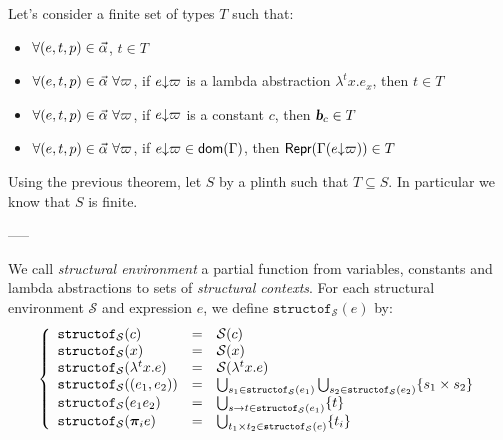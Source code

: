 \documentclass[a4paper]{article}
\theoremstyle{definition}
\begin{document}
    Let's consider a finite set of types $T$ such that:
    \begin{itemize}
      \item $\forall (e,t,p) \in \vec \alpha$, $t \in T$
      \item $\forall (e,t,p) \in \vec \alpha\ \forall \varpi$, if $e{\downarrow}\varpi$ is a lambda abstraction $\lambda^tx.e_x$, then $t \in T$
      \item $\forall (e,t,p) \in \vec \alpha\ \forall \varpi$, if $e{\downarrow}\varpi$ is a constant $c$, then $\basic{c} \in T$
      \item $\forall (e,t,p) \in \vec \alpha\ \forall \varpi$, if $e{\downarrow}\varpi \in \textsf{dom}(\Gamma)$, then $\textsf{Repr}(\Gamma(e{\downarrow}\varpi)) \in T$
    \end{itemize}

    Using the previous theorem, let $S$ by a plinth such that $T \subseteq S$. In particular we know that $S$ is finite.

    \newcommand{\struct}[0]{\mathcal{S}}
    \newcommand{\pathstr}[2]{\texttt{path\_struct}_{#1}(#2)}
    \newcommand{\structof}[2]{\texttt{structof}_{#1}(#2)}
    \newcommand{\refinestr}[2]{\texttt{RefineStr}_{#1}(#2)}
    \newcommand{\auxstr}[1]{\texttt{AuxStr}_{#1}}
    \newcommand{\structs}[2]{\texttt{Struct}_{#1}(#2)}

    -----

    We call \textit{structural environment} a partial function from variables, constants and lambda abstractions to sets of \textit{structural contexts}.
    For each structural environment $\struct$ and expression $e$, we define $\structof \struct e$ by:
    \[
      \left\{
        \begin{array}{lcl}
          \structof{\struct}{c} & = & \struct(c) \\
          \structof{\struct}{x} & = & \struct(x) \\
          \structof{\struct}{\lambda^tx.e} & = & \struct(\lambda^tx.e) \\
          \structof{\struct}{(e_1,e_2)} & = & \bigcup_{s_1\in\structof{\struct}{e_1}}\bigcup_{s_2\in\structof{\struct}{e_2}}  \{ \pair {s_1} {s_2} \} \\
          \structof{\struct}{e_1 e_2} & = & \bigcup_{\arrow s t\in\structof{\struct}{e_1}} \{ t \} \\
          \structof{\struct}{\bpi_i e} & = & \bigcup_{\pair {t_1} {t_2}\in\structof{\struct}{e}} \{ t_i \}
        \end{array}  
      \right.
    \]
\end{document}
